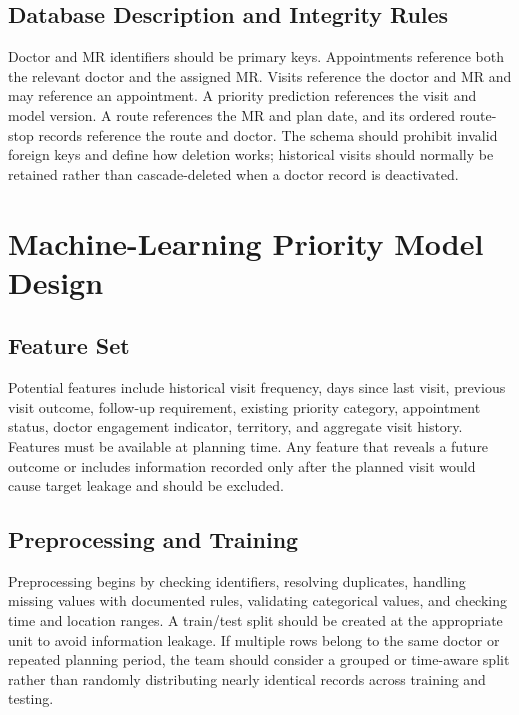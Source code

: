 \documentclass[12pt,a4paper,oneside]{report}
\begin{document}
\subsection{Database Description and Integrity Rules}
Doctor and MR identifiers should be primary keys. Appointments reference both the relevant doctor and the assigned MR. Visits reference the doctor and MR and may reference an appointment. A priority prediction references the visit and model version. A route references the MR and plan date, and its ordered route-stop records reference the route and doctor. The schema should prohibit invalid foreign keys and define how deletion works; historical visits should normally be retained rather than cascade-deleted when a doctor record is deactivated.

\section{Machine-Learning Priority Model Design}
\subsection{Feature Set}
Potential features include historical visit frequency, days since last visit, previous visit outcome, follow-up requirement, existing priority category, appointment status, doctor engagement indicator, territory, and aggregate visit history. Features must be available at planning time. Any feature that reveals a future outcome or includes information recorded only after the planned visit would cause target leakage and should be excluded.

\subsection{Preprocessing and Training}
Preprocessing begins by checking identifiers, resolving duplicates, handling missing values with documented rules, validating categorical values, and checking time and location ranges. A train/test split should be created at the appropriate unit to avoid information leakage. If multiple rows belong to the same doctor or repeated planning period, the team should consider a grouped or time-aware split rather than randomly distributing nearly identical records across training and testing.
\end{document}
